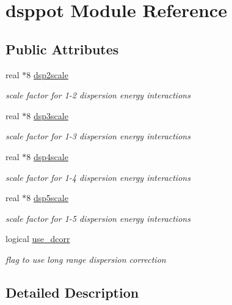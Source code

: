 \hypertarget{classdsppot}{\section{dsppot Module Reference}
\label{classdsppot}
}
\subsection*{Public Attributes}
\begin{DoxyCompactItemize}
\item 
real $\ast$8 \hyperlink{classdsppot_a2c9d8ffce51120f361337e58240dba93}{dsp2scale}
\begin{DoxyCompactList}\small\item\em scale factor for 1-\/2 dispersion energy interactions \end{DoxyCompactList}\item 
real $\ast$8 \hyperlink{classdsppot_a895607cab88f1962d1354901bc8a23db}{dsp3scale}
\begin{DoxyCompactList}\small\item\em scale factor for 1-\/3 dispersion energy interactions \end{DoxyCompactList}\item 
real $\ast$8 \hyperlink{classdsppot_a422ba96af8ba6bf83f0d53462fb82984}{dsp4scale}
\begin{DoxyCompactList}\small\item\em scale factor for 1-\/4 dispersion energy interactions \end{DoxyCompactList}\item 
real $\ast$8 \hyperlink{classdsppot_a515456a9c4b0342a8e81a2b4b66521ae}{dsp5scale}
\begin{DoxyCompactList}\small\item\em scale factor for 1-\/5 dispersion energy interactions \end{DoxyCompactList}\item 
logical \hyperlink{classdsppot_a6d08119e9c2cbd027dc0256f83f12e97}{use\-\_\-dcorr}
\begin{DoxyCompactList}\small\item\em flag to use long range dispersion correction \end{DoxyCompactList}\end{DoxyCompactItemize}


\subsection{Detailed Description}


